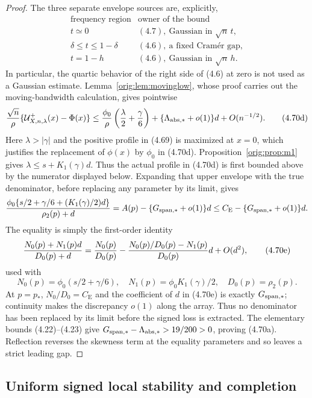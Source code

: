 \documentclass[11pt,a4paper]{article}
\numberwithin{equation}{section}
\theoremstyle{definition}
\theoremstyle{remark}
\newcommand{\CE}{C_{\mathrm E}}
\begin{document}
\begin{proof}
The three separate envelope sources are, explicitly,
\[
 \begin{array}{c|c}
 \text{frequency region}&\text{owner of the bound}\\ \hline
 t\simeq0&(4.7),\ \text{Gaussian in }\sqrt n\,t,\\
 \delta\le t\le1-\delta&(4.6),\ \text{a fixed Cram\'er gap},\\
 t=1-h&(4.6),\ \text{Gaussian in }\sqrt n\,h.
 \end{array}                                             \tag{4.70b}
\]
In particular, the quartic behavior of the right side of (4.6) at zero
is not used as a Gaussian estimate.  Lemma~\ref{orig:lem:movinglow}, whose
proof carries out the moving-bandwidth calculation, gives pointwise
\[
 {\sqrt n\over\rho}\{\mathcal U^+_{X,n,\lambda}(x)-\Phi(x)\}
 \le {\phi_0\over\rho}\left({\lambda\over2}+{\gamma\over6}\right)
       +\{\Lambda_{\rm abs,*}+o(1)\}d+O(n^{-1/2}).     \tag{4.70d}
\]
Here $\lambda>|\gamma|$ and the positive profile in (4.69) is maximized at
$x=0$, which justifies the replacement of $\phi(x)$ by $\phi_0$ in
(4.70d).
Proposition~\ref{orig:prop:m1} gives $\lambda\le s+K_1(\gamma)d$.  Thus the
actual profile in (4.70d) is first bounded above by the numerator displayed
below.  Expanding that upper envelope with the true denominator, before
replacing any parameter by its limit, gives
\[
 {\phi_0\{s/2+\gamma/6+(K_1(\gamma)/2)d\}\over\rho_2(p)+d}
 =A(p)-\{G_{\rm span,*}+o(1)\}d\le
 \CE-\{G_{\rm span,*}+o(1)\}d.
\]
The equality is simply the first-order identity
\[
 {N_0(p)+N_1(p)d\over D_0(p)+d}
 ={N_0(p)\over D_0(p)}
 -{N_0(p)/D_0(p)-N_1(p)\over D_0(p)}d+O(d^2),           \tag{4.70e}
\]
used with
\[
 N_0(p)=\phi_0(s/2+\gamma/6),\quad
 N_1(p)=\phi_0K_1(\gamma)/2,\quad D_0(p)=\rho_2(p).
\]
At $p=p_*$, $N_0/D_0=\CE$ and the coefficient of $d$ in
(4.70e) is exactly $G_{\rm span,*}$; continuity makes the discrepancy
$o(1)$ along the array.  Thus no denominator has been replaced by its
limit before the signed loss is extracted.
The elementary bounds (4.22)--(4.23) give
$G_{\rm span,*}-\Lambda_{\rm abs,*}>19/200>0$, proving (4.70a).
Reflection reverses the
skewness term at the equality parameters and so leaves a strict leading
gap.
\end{proof}

\subsection*{Uniform signed local stability and completion}
\end{document}
